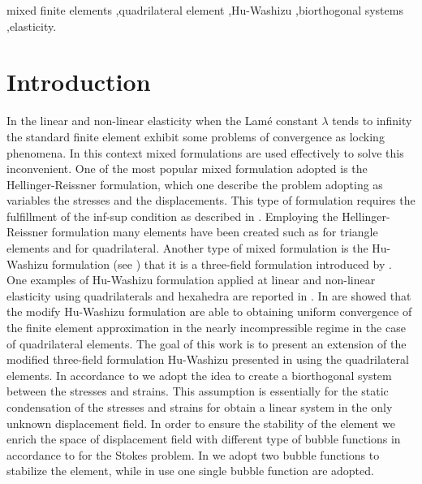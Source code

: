 \documentclass[preprint,12pt,authoryear]{elsarticle}
\begin{document}
\begin{frontmatter}
\begin{keyword}
mixed finite elements \sep quadrilateral element \sep Hu-Washizu \sep biorthogonal systems \sep elasticity.



\end{keyword}

\end{frontmatter}

\linenumbers
\section{Introduction}\label{sec:one}
In the linear and non-linear elasticity when the Lamé constant $\lambda$ tends to infinity the standard finite element exhibit some problems of convergence as locking phenomena.
In this context mixed formulations are used effectively to solve this inconvenient.
One of the most popular mixed formulation adopted is the Hellinger-Reissner formulation, which one describe the problem adopting as variables the stresses and the displacements.
This type of formulation requires the fulfillment of the inf-sup condition as described in \cite{boffi_book}.
Employing the Hellinger-Reissner formulation many elements have been created such as \cite{arnold} for triangle elements and \cite{arnold_quad} for quadrilateral. 
Another type of mixed formulation is the Hu-Washizu formulation (see \cite{hu,washizu}) that it is a three-field formulation introduced by \cite{veubeke}.
One examples of Hu-Washizu formulation applied at linear and non-linear elasticity using quadrilaterals and hexahedra are reported in \cite{kasper_p1}. 
In \cite{lamichhane_conv} are showed that the modify Hu-Washizu formulation are able to obtaining uniform convergence of the finite element approximation in the nearly incompressible regime in the case of quadrilateral elements.
The goal of this work is to present an extension of the modified three-field formulation Hu-Washizu presented in \cite{lamichhane_huwashizu} using the quadrilateral elements.
In accordance to \cite{lamichhane_three} we adopt the idea to create a biorthogonal system between the stresses and strains.
This assumption is essentially for the static condensation of the stresses and strains for obtain a linear system in the only unknown displacement field.
In order to ensure the stability of the element we enrich the space of displacement field with different type of bubble functions in accordance to \cite{bai,lamichhane} for the Stokes problem. 
In \cite{bai} we adopt two bubble functions to stabilize the element, while in \cite{lamichhane} use one single bubble function are adopted.  
 
\end{document}
